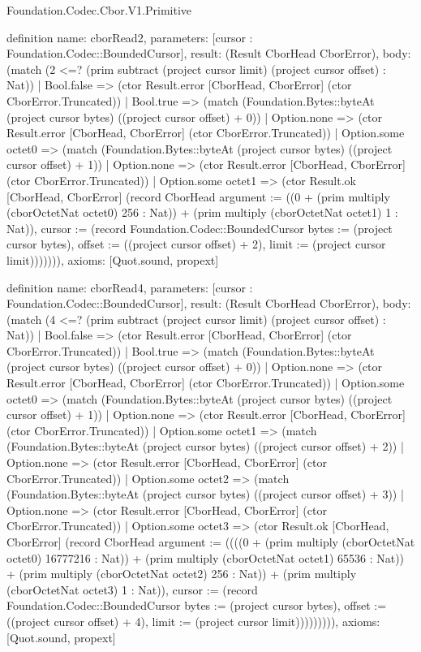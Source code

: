 \begin{lexlean}{Foundation.Codec.Cbor.V1.Primitive}
\begin{semanticmodule}
definition{
  name: cborRead2,
  parameters: [cursor : Foundation.Codec::BoundedCursor],
  result: (Result CborHead CborError),
  body: (match (2 <=? (prim subtract (project cursor limit) (project cursor offset) : Nat))
    | Bool.false => (ctor Result.error [CborHead, CborError] (ctor CborError.Truncated))
    | Bool.true => (match (Foundation.Bytes::byteAt (project cursor bytes) ((project cursor offset) + 0))
      | Option.none => (ctor Result.error [CborHead, CborError] (ctor CborError.Truncated))
      | Option.some octet0 => (match (Foundation.Bytes::byteAt (project cursor bytes) ((project cursor offset) + 1))
        | Option.none => (ctor Result.error [CborHead, CborError] (ctor CborError.Truncated))
        | Option.some octet1 => (ctor Result.ok [CborHead, CborError] (record CborHead {argument := ((0 + (prim multiply (cborOctetNat octet0) 256 : Nat)) + (prim multiply (cborOctetNat octet1) 1 : Nat)), cursor := (record Foundation.Codec::BoundedCursor {bytes := (project cursor bytes), offset := ((project cursor offset) + 2), limit := (project cursor limit)})}))))),
  axioms: [Quot.sound, propext]
}

definition{
  name: cborRead4,
  parameters: [cursor : Foundation.Codec::BoundedCursor],
  result: (Result CborHead CborError),
  body: (match (4 <=? (prim subtract (project cursor limit) (project cursor offset) : Nat))
    | Bool.false => (ctor Result.error [CborHead, CborError] (ctor CborError.Truncated))
    | Bool.true => (match (Foundation.Bytes::byteAt (project cursor bytes) ((project cursor offset) + 0))
      | Option.none => (ctor Result.error [CborHead, CborError] (ctor CborError.Truncated))
      | Option.some octet0 => (match (Foundation.Bytes::byteAt (project cursor bytes) ((project cursor offset) + 1))
        | Option.none => (ctor Result.error [CborHead, CborError] (ctor CborError.Truncated))
        | Option.some octet1 => (match (Foundation.Bytes::byteAt (project cursor bytes) ((project cursor offset) + 2))
          | Option.none => (ctor Result.error [CborHead, CborError] (ctor CborError.Truncated))
          | Option.some octet2 => (match (Foundation.Bytes::byteAt (project cursor bytes) ((project cursor offset) + 3))
            | Option.none => (ctor Result.error [CborHead, CborError] (ctor CborError.Truncated))
            | Option.some octet3 => (ctor Result.ok [CborHead, CborError] (record CborHead {argument := ((((0 + (prim multiply (cborOctetNat octet0) 16777216 : Nat)) + (prim multiply (cborOctetNat octet1) 65536 : Nat)) + (prim multiply (cborOctetNat octet2) 256 : Nat)) + (prim multiply (cborOctetNat octet3) 1 : Nat)), cursor := (record Foundation.Codec::BoundedCursor {bytes := (project cursor bytes), offset := ((project cursor offset) + 4), limit := (project cursor limit)})}))))))),
  axioms: [Quot.sound, propext]
}


\end{semanticmodule}
\end{lexlean}

